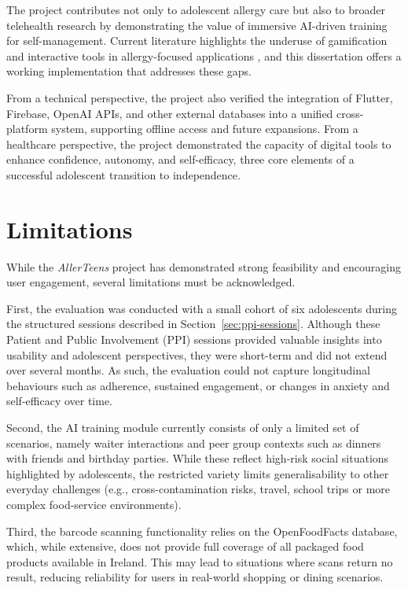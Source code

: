 \documentclass[MScCS]{uccthesis}
\begin{document}
The project contributes not only to adolescent allergy care but also to broader telehealth research by demonstrating the value of immersive AI-driven training for self-management. Current literature highlights the underuse of gamification and interactive tools in allergy-focused applications \parencite{sullivan2024telehealth, gajardo2023gamification}, and this dissertation offers a working implementation that addresses these gaps.  

From a technical perspective, the project also verified the integration of Flutter, Firebase, OpenAI APIs, and other external databases into a unified cross-platform system, supporting offline access and future expansions. From a healthcare perspective, the project demonstrated the capacity of digital tools to enhance confidence, autonomy, and self-efficacy, three core elements of a successful adolescent transition to independence.


\section{Limitations}
While the \textit{AllerTeens} project has demonstrated strong feasibility and encouraging user engagement, several limitations must be acknowledged.  

First, the evaluation was conducted with a small cohort of six adolescents during the structured sessions described in Section~\ref{sec:ppi-sessions}. Although these Patient and Public Involvement (PPI) sessions provided valuable insights into usability and adolescent perspectives, they were short-term and did not extend over several months. As such, the evaluation could not capture longitudinal behaviours such as adherence, sustained engagement, or changes in anxiety and self-efficacy over time.  

Second, the AI training module currently consists of only a limited set of scenarios, namely waiter interactions and peer group contexts such as dinners with friends and birthday parties. While these reflect high-risk social situations highlighted by adolescents, the restricted variety limits generalisability to other everyday challenges (e.g., cross-contamination risks, travel, school trips or more complex food-service environments).  

Third, the barcode scanning functionality relies on the OpenFoodFacts database, which, while extensive, does not provide full coverage of all packaged food products available in Ireland. This may lead to situations where scans return no result, reducing reliability for users in real-world shopping or dining scenarios.  
\end{document}
